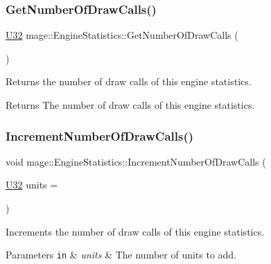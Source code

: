 \subsubsection{\texorpdfstring{Get\+Number\+Of\+Draw\+Calls()}{GetNumberOfDrawCalls()}}
{\footnotesize\ttfamily \hyperlink{namespacemage_a41c104c036fba3756a74e19f793eeaa1}{U32} mage\+::\+Engine\+Statistics\+::\+Get\+Number\+Of\+Draw\+Calls (\begin{DoxyParamCaption}{ }\end{DoxyParamCaption})\hspace{0.3cm}{\ttfamily [noexcept]}}

Returns the number of draw calls of this engine statistics.

\begin{DoxyReturn}{Returns}
The number of draw calls of this engine statistics. 
\end{DoxyReturn}
\hypertarget{structmage_1_1_engine_statistics_af26859407a4780e9471131fcfbe3a125}{}\label{structmage_1_1_engine_statistics_af26859407a4780e9471131fcfbe3a125} 
\subsubsection{\texorpdfstring{Increment\+Number\+Of\+Draw\+Calls()}{IncrementNumberOfDrawCalls()}}
{\footnotesize\ttfamily void mage\+::\+Engine\+Statistics\+::\+Increment\+Number\+Of\+Draw\+Calls (\begin{DoxyParamCaption}\item[{\hyperlink{namespacemage_a41c104c036fba3756a74e19f793eeaa1}{U32}}]{units = {} }\end{DoxyParamCaption})\hspace{0.3cm}{\ttfamily [noexcept]}}

Increments the number of draw calls of this engine statistics.


\begin{DoxyParams}[1]{Parameters}
\mbox{\tt in}  & {\em units} & The number of units to add. \\
\hline
\end{DoxyParams}
\hypertarget{structmage_1_1_engine_statistics_a6c5e8b9a5806e67f6f93a3c558293249}{}\label{structmage_1_1_engine_statistics_a6c5e8b9a5806e67f6f93a3c558293249} 
